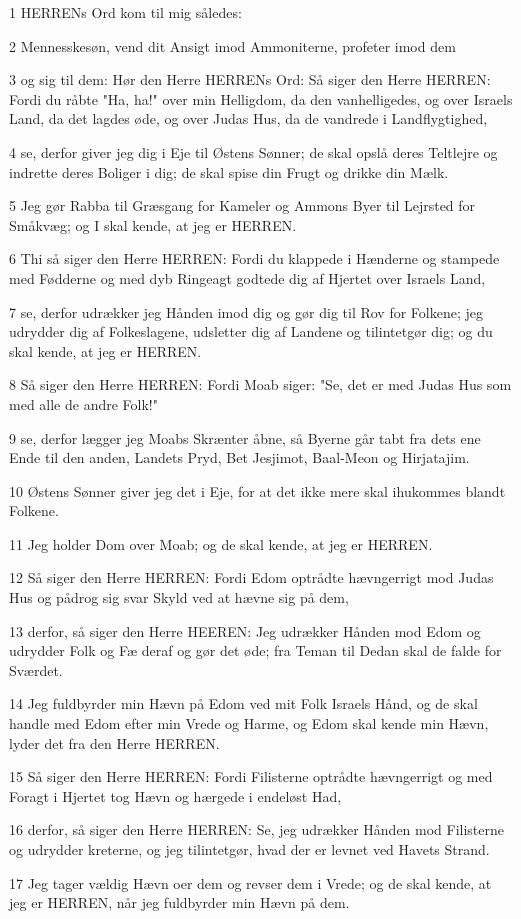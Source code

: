 \par 1 HERRENs Ord kom til mig således:
\par 2 Mennesskesøn, vend dit Ansigt imod Ammoniterne, profeter imod dem
\par 3 og sig til dem: Hør den Herre HERRENs Ord: Så siger den Herre HERREN: Fordi du råbte "Ha, ha!" over min Helligdom, da den vanhelligedes, og over Israels Land, da det lagdes øde, og over Judas Hus, da de vandrede i Landflygtighed,
\par 4 se, derfor giver jeg dig i Eje til Østens Sønner; de skal opslå deres Teltlejre og indrette deres Boliger i dig; de skal spise din Frugt og drikke din Mælk.
\par 5 Jeg gør Rabba til Græsgang for Kameler og Ammons Byer til Lejrsted for Småkvæg; og I skal kende, at jeg er HERREN.
\par 6 Thi så siger den Herre HERREN: Fordi du klappede i Hænderne og stampede med Fødderne og med dyb Ringeagt godtede dig af Hjertet over Israels Land,
\par 7 se, derfor udrækker jeg Hånden imod dig og gør dig til Rov for Folkene; jeg udrydder dig af Folkeslagene, udsletter dig af Landene og tilintetgør dig; og du skal kende, at jeg er HERREN.
\par 8 Så siger den Herre HERREN: Fordi Moab siger: "Se, det er med Judas Hus som med alle de andre Folk!"
\par 9 se, derfor lægger jeg Moabs Skrænter åbne, så Byerne går tabt fra dets ene Ende til den anden, Landets Pryd, Bet Jesjimot, Baal-Meon og Hirjatajim.
\par 10 Østens Sønner giver jeg det i Eje, for at det ikke mere skal ihukommes blandt Folkene.
\par 11 Jeg holder Dom over Moab; og de skal kende, at jeg er HERREN.
\par 12 Så siger den Herre HERREN: Fordi Edom optrådte hævngerrigt mod Judas Hus og pådrog sig svar Skyld ved at hævne sig på dem,
\par 13 derfor, så siger den Herre HEEREN: Jeg udrækker Hånden mod Edom og udrydder Folk og Fæ deraf og gør det øde; fra Teman til Dedan skal de falde for Sværdet.
\par 14 Jeg fuldbyrder min Hævn på Edom ved mit Folk Israels Hånd, og de skal handle med Edom efter min Vrede og Harme, og Edom skal kende min Hævn, lyder det fra den Herre HERREN.
\par 15 Så siger den Herre HERREN: Fordi Filisterne optrådte hævngerrigt og med Foragt i Hjertet tog Hævn og hærgede i endeløst Had,
\par 16 derfor, så siger den Herre HERREN: Se, jeg udrækker Hånden mod Filisterne og udrydder kreterne, og jeg tilintetgør, hvad der er levnet ved Havets Strand.
\par 17 Jeg tager vældig Hævn oer dem og revser dem i Vrede; og de skal kende, at jeg er HERREN, når jeg fuldbyrder min Hævn på dem.

